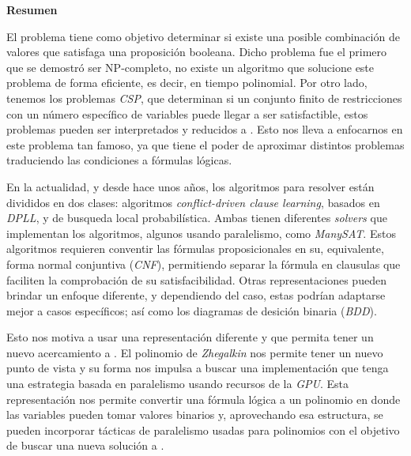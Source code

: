 \cleardoublepage
{}
{}
\thispagestyle{pagebottom}
\noindent\textbf{\Huge Resumen}

\vspace{2em}

El problema \sat tiene como objetivo determinar si existe una posible combinación de valores que satisfaga una proposición booleana. Dicho problema fue el primero que se demostró ser NP-completo\cite{Cook}, no existe un algoritmo que solucione este problema de forma eficiente, es decir, en tiempo polinomial. Por otro lado, tenemos los problemas \textit{CSP}, que determinan si un conjunto finito de restricciones con un número específico de variables puede llegar a ser satisfactible, estos problemas pueden ser interpretados y reducidos a \sat. Esto nos lleva a enfocarnos en este problema tan famoso, ya que tiene el poder de aproximar distintos problemas traduciendo las condiciones a fórmulas lógicas.

En la actualidad, y desde hace unos años, los algoritmos para resolver \sat están divididos en dos clases: algoritmos \textit{conflict-driven clause learning}\cite{DBLP}, basados en \textit{DPLL}, y de busqueda local probabilística. Ambas tienen diferentes \textit{solvers} que implementan los algoritmos, algunos usando paralelismo, como \textit{ManySAT}\cite{manysat}. Estos algoritmos requieren conventir las fórmulas proposicionales en su, equivalente, forma normal conjuntiva (\textit{CNF}), permitiendo separar la fórmula en clausulas que faciliten la comprobación de su satisfacibilidad. Otras representaciones pueden brindar un enfoque diferente, y dependiendo del caso, estas podrían adaptarse mejor a casos específicos; así como los diagramas de desición binaria (\textit{BDD}).

Esto nos motiva a usar una representación diferente y que permita tener un nuevo acercamiento a \sat. El polinomio de \textit{Zhegalkin}\cite{zhegalkin} nos permite tener un nuevo punto de vista y su forma nos impulsa a buscar una implementación que tenga una estrategia basada en paralelismo usando recursos de la \textit{GPU}. Esta representación nos permite convertir una fórmula lógica a un polinomio en donde las variables pueden tomar valores binarios y, aprovechando esa estructura, se pueden incorporar tácticas de paralelismo usadas para polinomios con el objetivo de buscar una nueva solución a \sat.

\newpage
